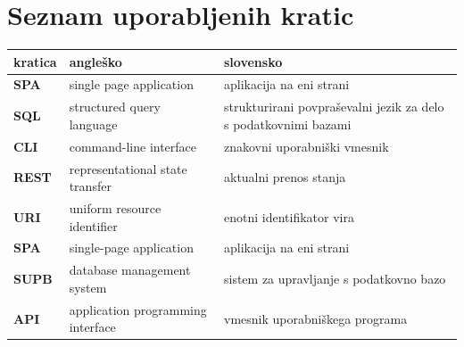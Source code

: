 \documentclass[a4paper, 12pt]{book}
\newcommand{\clearemptydoublepage}{\newpage{\pagestyle{empty}\cleardoublepage}}
\begin{document}
\clearemptydoublepage


\pagestyle{empty}
\def\thepage{}%
\tableofcontents{}

\clearemptydoublepage


\chapter*{Seznam uporabljenih kratic}  %

\noindent\begin{tabular}{p{}|p{}|p{}}    %
  {\bf kratica} & {\bf angleško}                             & {\bf slovensko} \\ \hline
  {\bf SPA}      & single page application               &  aplikacija na eni strani \\
  {\bf SQL} & structured query language & strukturirani povpraševalni jezik za delo s podatkovnimi bazami  \\
  {\bf CLI}   & command-line interface              & znakovni uporabniški vmesnik \\
  {\bf REST}   & representational state transfer              & aktualni prenos stanja \\
  {\bf URI}   &  uniform resource identifier              & enotni identifikator vira \\
  {\bf SPA}   &  single-page application              & aplikacija na eni strani \\
  {\bf SUPB}   &  database management system              & sistem za upravljanje s podatkovno bazo \\
  {\bf API}   &  application programming interface              & vmesnik uporabniškega programa \\
\end{tabular}
\end{document}
